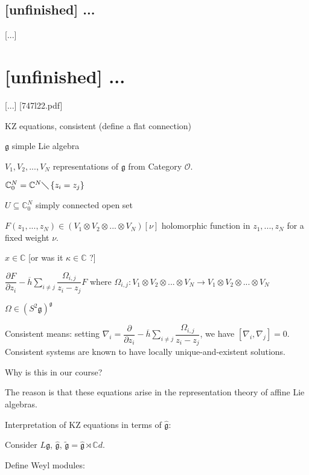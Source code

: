 \documentclass[etingof-lie.tex]{subfiles}
\begin{document}
\subsection{\textbf{[unfinished]} ...}

[...]
\section{\textbf{[unfinished]} ...}

[...] [747l22.pdf]

KZ equations, consistent (define a flat connection)

$\mathfrak{g}$ simple Lie algebra

$V_{1},V_{2},...,V_{N}$ representations of $\mathfrak{g}$ from Category
$\mathcal{O}$.

$\mathbb{C}_{0}^{N}=\mathbb{C}^{N}\diagdown\left\{  z_{i}=z_{j}\right\}  $

$U\subseteq\mathbb{C}_{0}^{N}$ simply connected open set

$F\left(  z_{1},...,z_{N}\right)  \in\left(  V_{1}\otimes V_{2}\otimes
...\otimes V_{N}\right)  \left[  \nu\right]  $ holomorphic function in
$z_{1},...,z_{N}$ for a fixed weight $\nu$.

$x\in\mathbb{C}$ [or was it $\kappa\in\mathbb{C}$ ?]

$\dfrac{\partial F}{\partial z_{i}}-\overline{h}\sum\limits_{i\neq j}%
\dfrac{\Omega_{i,j}}{z_{i}-z_{j}}F$ where $\Omega_{i,j}:V_{1}\otimes
V_{2}\otimes...\otimes V_{N}\rightarrow V_{1}\otimes V_{2}\otimes...\otimes
V_{N}$

$\Omega\in\left(  S^{2}\mathfrak{g}\right)  ^{\mathfrak{g}}$

Consistent means: setting $\nabla_{i}=\dfrac{\partial}{\partial z_{i}%
}-\overline{h}\sum\limits_{i\neq j}\dfrac{\Omega_{i,j}}{z_{i}-z_{j}}$, we have
$\left[  \nabla_{i},\nabla_{j}\right]  =0$. Consistent systems are known to
have locally unique-and-existent solutions.

Why is this in our course?

The reason is that these equations arise in the representation theory of
affine Lie algebras.

Interpretation of KZ equations in terms of $\widehat{\mathfrak{g}}$:

Consider $L\mathfrak{g}$, $\widehat{\mathfrak{g}}$, $\widetilde{\mathfrak{g}%
}=\widehat{\mathfrak{g}}\rtimes\mathbb{C}d$.

Define Weyl modules:
\end{document}
